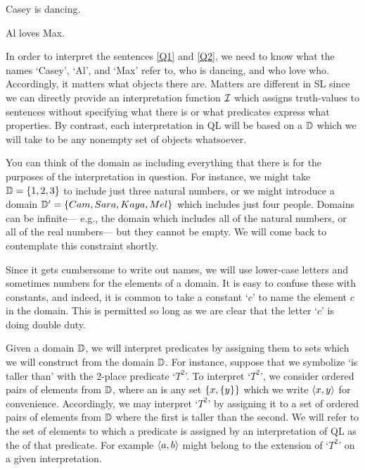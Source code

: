 \begin{earg}
  \item[\ex{Q1}] Casey is dancing.
  \item[\ex{Q2}] Al loves Max.
\end{earg}

In order to interpret the sentences \ref{Q1} and \ref{Q2}, we need to know what the names `Casey', `Al', and `Max' refer to, who is dancing, and who love who.
Accordingly, it matters what objects there are.
Matters are different in SL since we can directly provide an interpretation function $\mathcal{I}$ which assigns truth-values to sentences without specifying what there is or what predicates express what properties.
By contrast, each interpretation in QL will be based on a  $\mathbb{D}$ which we will take to be any nonempty set of objects whatsoever.


You can think of the domain as including everything that there is for the purposes of the interpretation in question.
For instance, we might take $\mathbb{D}=\lbrace1,2,3\rbrace$ to include just three natural numbers, or we might introduce a domain $\mathbb{D}'=\lbrace Cam, Sara, Kaya, Mel\rbrace$ which includes just four people.
Domains can be infinite--- e.g., the domain which includes all of the natural numbers, or all of the real numbers--- but they cannot be empty.
We will come back to contemplate this constraint shortly.

Since it gets cumbersome to write out names, we will use lower-case letters and sometimes numbers for the elements of a domain.
It is easy to confuse these with constants, and indeed, it is common to take a constant `$c$' to name the element $c$ in the domain.
This is permitted so long as we are clear that the letter `$c$' is doing double duty.

Given a domain $\mathbb{D}$, we will interpret predicates by assigning them to sets which we will construct from the domain $\mathbb{D}$.
For instance, suppose that we symbolize `is taller than' with the $2$-place predicate `$T^2$'.
To interpret `$T^2$', we consider ordered pairs of elements from $\mathbb{D}$, where an  is any set $\lbrace x,\lbrace y\rbrace\rbrace$ which we write $\langle x,y\rangle$ for convenience. 
Accordingly, we may interpret `$T^2$' by assigning it to a set of ordered pairs of elements from $\mathbb{D}$ where the first is taller than the second.
We will refer to the set of elements to which a predicate is assigned by an interpretation of QL as the  of that predicate.
For example $\langle a,b\rangle$ might belong to the extension of `$T^2$' on a given interpretation. 

